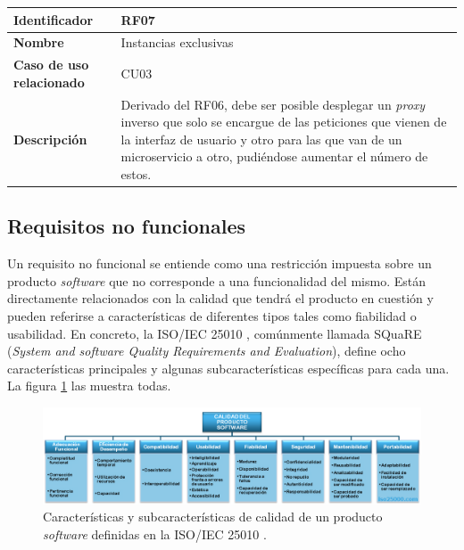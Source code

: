 \documentclass[11pt,spanish,listoffigures]{tfgetsinf}
\begin{document}
\begin{center} \begin{tabular}{| l | p{9.5cm} |}
\hline
\textbf{Identificador} & RF07
\\ \hline
\textbf{Nombre} & Instancias exclusivas
\\ \hline
\textbf{Caso de uso relacionado} & CU03
\\ \hline
\textbf{Descripción} & Derivado del RF06, debe ser posible desplegar un \emph{proxy} inverso que solo se encargue de las peticiones que vienen de la interfaz de usuario y otro para las que van de un microservicio a otro, pudiéndose aumentar el número de estos.
\\ \hline \end{tabular} \end{center}


		\subsection{Requisitos no funcionales} \label{requisitosNoFuncionales}
		
Un requisito no funcional se entiende como una restricción impuesta sobre un producto \emph{software} que no corresponde a una funcionalidad del mismo. Están directamente relacionados con la calidad que tendrá el producto en cuestión y pueden referirse a características de diferentes tipos tales como fiabilidad o usabilidad. En concreto, la ISO/IEC 25010 \cite{ISO25010}, comúnmente llamada SQuaRE (\emph{System and software Quality Requirements and Evaluation}), define ocho características principales y algunas subcaracterísticas específicas para cada una. La figura \ref{iso25010} las muestra todas.

\begin{figure}[ht]
\centering
\includegraphics[width=1\textwidth]{imagenes/iso25010}
\caption[Características y subcaracterísticas de calidad de un producto \emph{software} definidas en la ISO/IEC 25010.]{Características y subcaracterísticas de calidad de un producto \emph{software} definidas en la ISO/IEC 25010 \cite{ISO25010}.}
	\label{iso25010}
\end{figure}
\end{document}
